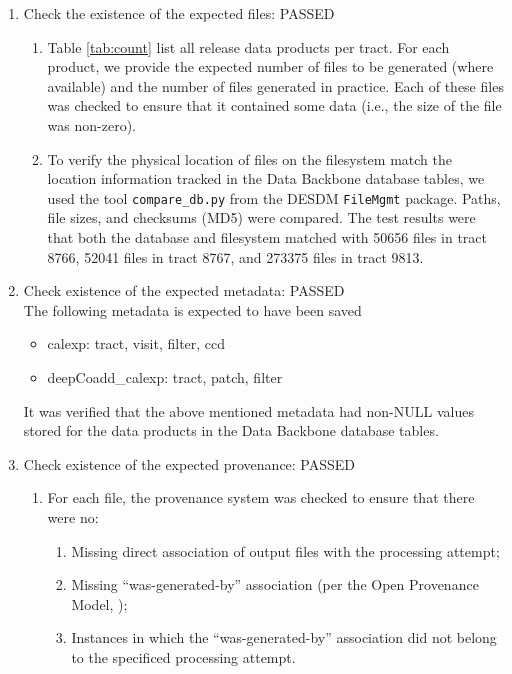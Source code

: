 \documentclass[DM,STR,toc]{lsstdoc}
\begin{document}
\begin{enumerate}

  \item{Check the existence of the expected files: PASSED}

  \begin{enumerate}

    \item{
      Table \ref{tab:count} list all release data products per tract.
      For each product, we provide the expected number of files to be generated (where available) and the number of files generated in practice.
      Each of these files was checked to ensure that it contained some data (i.e., the size of the file was non-zero).}

    \item{
      To verify the physical location of files on the filesystem match the location information tracked in the Data Backbone database tables, we used the tool
	  \texttt{compare{\_}db.py} from the DESDM \texttt{FileMgmt} package.
      Paths, file sizes, and checksums (MD5) were compared.
      The test results were that both the database and filesystem matched with 50656 files in tract 8766, 52041 files in tract 8767, and 273375 files in tract 9813.
    }
  \end{enumerate}

  \item{
    Check existence of the expected metadata: PASSED\\
    The following metadata is expected to have been saved

    \begin{itemize}
      \item{calexp: tract, visit, filter, ccd}
      \item{deepCoadd\_calexp: tract, patch, filter}
    \end{itemize}

    It was verified that the above mentioned metadata had non-NULL values stored for the data products in the Data Backbone database tables.
  }

  \item{
    Check existence of the expected provenance: PASSED

    \begin{enumerate}
      \item{For each file, the provenance system was checked to ensure that there were no:

        \begin{enumerate}
          \item{Missing direct association of output files with the processing attempt;}
          \item{Missing ``was-generated-by'' association (per the Open Provenance Model, \cite{soton271449});}
          \item{Instances in which the  ``was-generated-by'' association did
          not belong to the specificed processing attempt.}
        \end{enumerate}
      }


\end{enumerate}}
\end{enumerate}
\end{document}
